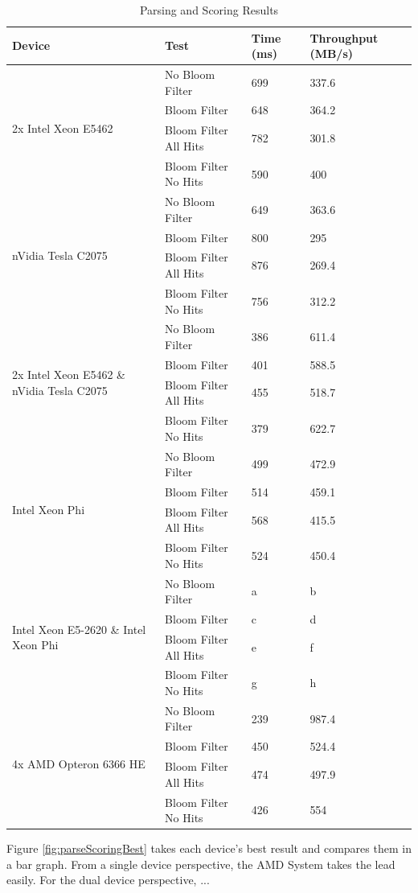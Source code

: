 \begin{table}[H]
\begin{tabular}{|l|l|l|l|}
\hline
Device & Test & Time (ms) & Throughput (MB/s)\\
\hline
\multirow{4}{*}{2x Intel Xeon E5462}
& No Bloom Filter & 699 & 337.6 \\
& Bloom Filter & 648 & 364.2 \\
& Bloom Filter All Hits & 782 & 301.8 \\
& Bloom Filter No Hits & 590 & 400 \\
\hline
\multirow{4}{*}{nVidia Tesla C2075}
& No Bloom Filter & 649 & 363.6 \\
& Bloom Filter & 800 & 295 \\
& Bloom Filter All Hits & 876 & 269.4 \\
& Bloom Filter No Hits & 756 & 312.2 \\
\hline
\multirow{4}{*}{2x Intel Xeon E5462 \& nVidia Tesla C2075}
& No Bloom Filter & 386 & 611.4 \\
& Bloom Filter & 401 & 588.5 \\
& Bloom Filter All Hits & 455 & 518.7 \\
& Bloom Filter No Hits & 379 & 622.7 \\
\hline
\multirow{4}{*}{Intel Xeon Phi}
& No Bloom Filter & 499 & 472.9 \\
& Bloom Filter & 514 & 459.1 \\
& Bloom Filter All Hits & 568 & 415.5 \\
& Bloom Filter No Hits & 524 & 450.4 \\
\hline
\multirow{4}{*}{Intel Xeon E5-2620 \& Intel Xeon Phi}
& No Bloom Filter & a & b \\
& Bloom Filter & c & d \\
& Bloom Filter All Hits & e & f \\
& Bloom Filter No Hits & g & h \\
\hline
\multirow{4}{*}{4x AMD Opteron 6366 HE}
& No Bloom Filter & 239 & 987.4 \\
& Bloom Filter & 450 & 524.4 \\
& Bloom Filter All Hits & 474 & 497.9 \\
& Bloom Filter No Hits & 426 & 554 \\
\hline
\end{tabular}
\caption{Parsing and Scoring Results}
\label{table:parsingScoring}
\end{table}

Figure \ref{fig:parseScoringBest} takes each device's best result and compares
them in a bar graph. From a single device perspective, the AMD System takes the
lead easily. For the dual device perspective, ...

